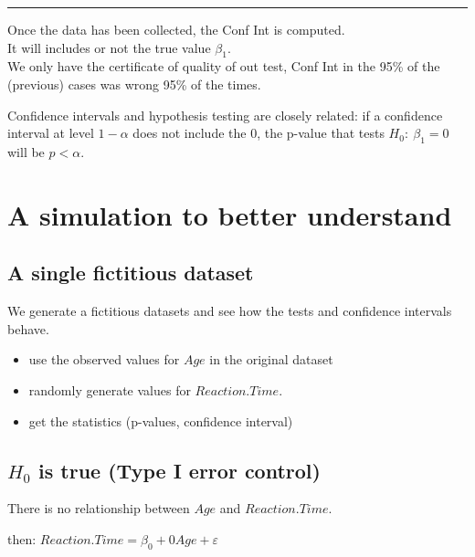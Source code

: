 \documentclass[]{article}
\providecommand{\tightlist}{%
  \setlength{\itemsep}{0pt}\setlength{\parskip}{0pt}}
\begin{document}
\begin{center}\rule{0.5\linewidth}{\linethickness}\end{center}

Once the data has been collected, the Conf Int is computed.\\
It will includes or not the true value \(\beta_1\).\\
We only have the certificate of quality of out test, Conf Int in the
95\% of the (previous) cases was wrong 95\% of the times.

Confidence intervals and hypothesis testing are closely related: if a
confidence interval at level \(1-\alpha\) does not include the 0, the
p-value that tests \(H_0:\ \beta_1 = 0\) will be \(p<\alpha\).

\hypertarget{a-simulation-to-better-understand}{%
\section{A simulation to better
understand}\label{a-simulation-to-better-understand}}

\hypertarget{a-single-fictitious-dataset}{%
\subsection{A single fictitious
dataset}\label{a-single-fictitious-dataset}}

We generate a fictitious datasets and see how the tests and confidence
intervals behave.

\begin{itemize}
\tightlist
\item
  use the observed values for \(Age\) in the original dataset\\
\item
  randomly generate values for \(Reaction.Time\).
\item
  get the statistics (p-values, confidence interval)
\end{itemize}

\hypertarget{h_0-is-true-type-i-error-control}{%
\subsection{\texorpdfstring{\(H_0\) is true (Type I error
control)}{H\_0 is true (Type I error control)}}\label{h_0-is-true-type-i-error-control}}

There is no relationship between \(Age\) and \(Reaction.Time\).

then: \(Reaction.Time=\beta_0 + 0 Age + \varepsilon\)
\end{document}
